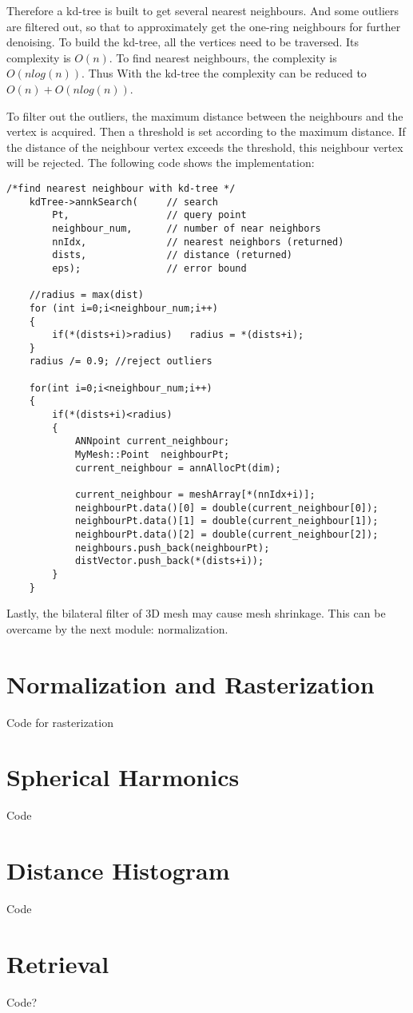 Therefore a kd-tree is built to get several nearest neighbours. And some outliers are filtered out, so that to approximately get the one-ring neighbours for further denoising. To build the kd-tree, all the vertices need to be traversed. Its complexity is $O(n)$. To find nearest neighbours, the complexity is $O(nlog(n))$. Thus With the kd-tree the complexity can be reduced to $O(n)+O(nlog(n))$.

To filter out the outliers, the maximum distance between the neighbours and the vertex is acquired. Then a threshold is set according to the maximum distance. If the distance of the neighbour vertex exceeds the threshold, this neighbour vertex will be rejected. The following code shows the implementation:

\begin{lstlisting}[xleftmargin=1em]
/*find nearest neighbour with kd-tree */
	kdTree->annkSearch(		// search
		Pt,					// query point
		neighbour_num,      // number of near neighbors
		nnIdx,				// nearest neighbors (returned)
		dists,				// distance (returned)
		eps);				// error bound

	//radius = max(dist)
	for (int i=0;i<neighbour_num;i++)
	{
		if(*(dists+i)>radius)	radius = *(dists+i); 
	}
	radius /= 0.9; //reject outliers

	for(int i=0;i<neighbour_num;i++)
	{
		if(*(dists+i)<radius)
		{
			ANNpoint current_neighbour;
			MyMesh::Point  neighbourPt;
			current_neighbour = annAllocPt(dim);

			current_neighbour = meshArray[*(nnIdx+i)];
			neighbourPt.data()[0] = double(current_neighbour[0]);
			neighbourPt.data()[1] = double(current_neighbour[1]);
			neighbourPt.data()[2] = double(current_neighbour[2]);
			neighbours.push_back(neighbourPt);
			distVector.push_back(*(dists+i));
		}
	}
\end{lstlisting}

Lastly, the bilateral filter of 3D mesh may cause mesh shrinkage. This can be overcame by the next module: normalization. 

\section{Normalization and Rasterization}
Code for rasterization
\section{Spherical Harmonics}
Code

\section{Distance Histogram}
Code
\section{Retrieval}
Code?
